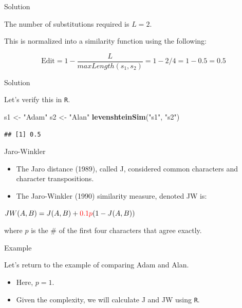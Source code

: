 \documentclass[
  ignorenonframetext,
]{beamer}
\newenvironment{Shaded}{\begin{snugshade}}{\end{snugshade}}
\newcommand{\KeywordTok}[1]{\textcolor[rgb]{0.13,0.29,0.53}{\textbf{#1}}}
\newcommand{\NormalTok}[1]{#1}
\newcommand{\StringTok}[1]{\textcolor[rgb]{0.31,0.60,0.02}{#1}}
\begin{document}
\begin{frame}{Solution}
\protect\hypertarget{solution}{}

The number of substitutions required is \(L=2.\)

This is normalized into a similarity function using the following:

\[\text{Edit} = 1-\frac{L}{maxLength(s_1, s_2)} = 1-2/4=1-0.5=0.5\]

\end{frame}

\begin{frame}[fragile]{Solution}
\protect\hypertarget{solution-1}{}

Let's verify this in \texttt{R}.

\begin{Shaded}
\begin{Highlighting}[]
\NormalTok{s1 <-}\StringTok{ "Adam"}
\NormalTok{s2 <-}\StringTok{ "Alan"}
\KeywordTok{levenshteinSim}\NormalTok{(}\StringTok{"s1"}\NormalTok{, }\StringTok{"s2"}\NormalTok{)}
\end{Highlighting}
\end{Shaded}

\begin{verbatim}
## [1] 0.5
\end{verbatim}

\end{frame}

\begin{frame}{Jaro-Winkler}
\protect\hypertarget{jaro-winkler}{}

\begin{itemize}
\item
  The Jaro distance (1989), called J, considered common characters and
  character transpositions.
\item
  The Jaro-Winkler (1990) similarity measure, denoted JW is:
\end{itemize}

\begin{center}
$ JW(A,B)= J(A,B) + \textcolor{red}{0.1p}(1-J(A,B)) $
\end{center}

where \(p\) is the \# of the first four characters that agree exactly.

\end{frame}

\begin{frame}{Example}
\protect\hypertarget{example-1}{}

Let's return to the example of comparing Adam and Alan.

\begin{itemize}
\item
  Here, \(p = 1.\)
\item
  Given the complexity, we will calculate J and JW using \texttt{R}.
\end{itemize}

\end{frame}
\end{document}
